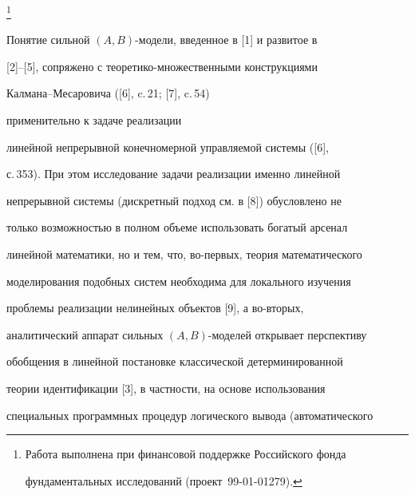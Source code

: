 \thanks{Работа выполнена при финансовой поддержке Российского фонда 


фундаментальных исследований (проект \No\,99-01-01279).} 


 


\date{} 




\pagestyle{plain} %


 




\maketitle 


\label{begin} 


 


Понятие сильной $(A,B)$-модели, введенное в [1] и развитое в 


[2]--[5], сопряжено с теоретико-множественными конструкциями 


Калмана--Месаровича ([6], c.\,21; [7], c.\,54) 


применительно к задаче реализации 


линейной непрерывной конечномерной управляемой системы ([6], 


с.\,353). При этом исследование задачи реализации именно линейной 


непрерывной системы (дискретный подход см. в [8]) обусловлено не 


только возможностью в полном объеме использовать богатый арсенал 


линейной математики, но и тем, что, во-первых, теория математического 


моделирования подобных систем необходима для локального изучения 


проблемы реализации нелинейных объектов [9], а во-вторых, 


аналитический аппарат сильных $(A,B)$-моделей открывает перспективу 


обобщения в линейной постановке классической детерминированной 


теории идентификации [3], в частности, на основе использования 


специальных программных процедур логического вывода (автоматического 


